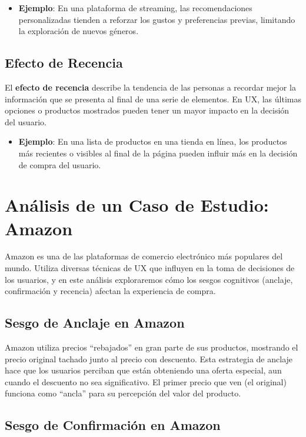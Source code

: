	\begin{itemize}
		\item \textbf{Ejemplo}: En una plataforma de streaming, las recomendaciones
			personalizadas tienden a reforzar los gustos y preferencias previas, limitando
			la exploración de nuevos géneros.
	\end{itemize}

	\subsection{Efecto de Recencia}

	El \textbf{efecto de recencia} describe la tendencia de las personas a
	recordar mejor la información que se presenta al final de una serie de
	elementos. En UX, las últimas opciones o productos mostrados pueden tener un
	mayor impacto en la decisión del usuario.

	\begin{itemize}
		\item \textbf{Ejemplo}: En una lista de productos en una tienda en línea,
			los productos más recientes o visibles al final de la página pueden
			influir más en la decisión de compra del usuario.
	\end{itemize}

	\section{Análisis de un Caso de Estudio: Amazon}

	Amazon es una de las plataformas de comercio electrónico más populares del mundo.
	Utiliza diversas técnicas de UX que influyen en la toma de decisiones de los
	usuarios, y en este análisis exploraremos cómo los sesgos cognitivos (anclaje,
	confirmación y recencia) afectan la experiencia de compra.

	\subsection{Sesgo de Anclaje en Amazon}

	Amazon utiliza precios ``rebajados'' en gran parte de sus productos, mostrando
	el precio original tachado junto al precio con descuento. Esta estrategia de anclaje
	hace que los usuarios perciban que están obteniendo una oferta especial, aun
	cuando el descuento no sea significativo. El primer precio que ven (el
	original) funciona como ``ancla'' para su percepción del valor del producto.

	\subsection{Sesgo de Confirmación en Amazon}

